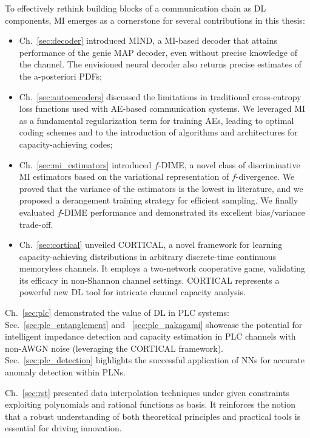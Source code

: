 To effectively rethink building blocks of a communication chain as DL components, MI emerges as a cornerstone for several contributions in this thesis:
\begin{itemize}

\item Ch.~\ref{sec:decoder} introduced MIND, a MI-based decoder that attains performance of the genie MAP decoder, even without precise knowledge of the channel. The envisioned neural decoder also returns precise estimates of the a-posteriori PDFs;

\item Ch.~\ref{sec:autoencoders} discussed the limitations in traditional cross-entropy loss functions used with AE-based communication systems. We leveraged MI as a fundamental regularization term for training AEs, leading to optimal coding schemes and to the introduction of algorithms and architectures for capacity-achieving codes;

\item Ch.~\ref{sec:mi_estimators} introduced $f$-DIME, a novel class of discriminative MI estimators based on the variational representation of $f$-divergence. We proved that the variance of the estimators is the lowest in literature, and we proposed a derangement training strategy for efficient sampling. We finally evaluated $f$-DIME performance and demonstrated its excellent bias/variance trade-off. 

\item Ch.~\ref{sec:cortical} unveiled CORTICAL, a novel framework for learning capacity-achieving distributions in arbitrary discrete-time continuous memoryless channels. It employs a two-network cooperative game, validating its efficacy in non-Shannon channel settings. CORTICAL represents a powerful new DL tool for intricate channel capacity analysis. 
\end{itemize}

Ch.~\ref{sec:plc} demonstrated the value of DL in PLC systems:
Sec.~\ref{sec:plc_entanglement} and ~\ref{sec:plc_nakagami} showcase the potential for intelligent impedance detection and capacity estimation in PLC channels with non-AWGN noise (leveraging the CORTICAL framework).
Sec.~\ref{sec:plc_detection} highlights the successful application of NNs for accurate anomaly detection within PLNs.

Ch.~\ref{sec:rst} presented data interpolation techniques under given constraints exploiting polynomials and rational functions as basis. It reinforces the notion that a robust understanding of both theoretical principles and practical tools is essential for driving innovation.


